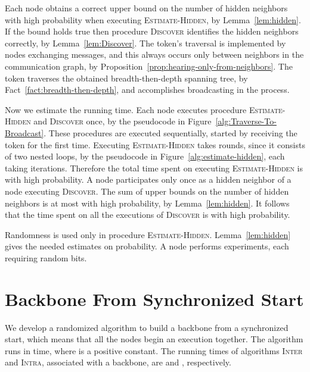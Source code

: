 \documentclass[11pt]{article}
\newcommand{\qed}{\hfill  \smallskip}
\newenvironment{proof}{\noindent{\bf Proof:}}{\qed}
\begin{document}
\begin{proof} 
Each node obtains a correct upper bound on the number of hidden neighbors with high probability when executing \textsc{Estimate-Hidden}, by Lemma~\ref{lem:hidden}.
If the bound holds true then procedure \textsc{Discover} identifies the hidden neighbors correctly, by Lemma~\ref{lem:Discover}.
The token's traversal is implemented by nodes exchanging messages, and this always occurs only between neighbors in the communication graph, by Proposition~\ref{prop:hearing-only-from-neighbors}.
The token traverses the obtained breadth-then-depth spanning tree, by Fact~\ref{fact:breadth-then-depth}, and accomplishes broadcasting in the process.

Now we estimate the running time. 
Each node executes procedure \textsc{Estimate-Hidden} and \textsc{Discover} once, by the pseudocode in Figure~\ref{alg:Traverse-To-Broadcast}.
These procedures are executed sequentially, started by receiving the token for the first time.
Executing \textsc{Estimate-Hidden}  takes  rounds, since it consists of two nested loops, by the pseudocode in Figure~\ref{alg:estimate-hidden}, each taking  iterations.
Therefore the total time spent on executing \textsc{Estimate-Hidden} is  with high probability.
A node participates only once as a hidden neighbor of a node executing \textsc{Discover}.
The sum of upper bounds on the number of hidden neighbors is at most  with high probability, by Lemma~\ref{lem:hidden}.
It follows that the time spent on all the executions of \textsc{Discover} is  with high probability.

Randomness is used only in procedure \textsc{Estimate-Hidden}.
Lemma~\ref{lem:hidden} gives the needed estimates on probability.
A node performs  experiments, each requiring  random bits.
\end{proof} 



\section{Backbone From Synchronized Start}

\label{sec:coordinated-start}



We develop a randomized algorithm to build a backbone  from a synchronized start, which means that all the nodes begin an execution together.
The algorithm runs in  time, where  is a positive constant. 
The running times of algorithms \textsc{Inter} and \textsc{Intra}, associated with a backbone, are  and , respectively.
\end{document}
